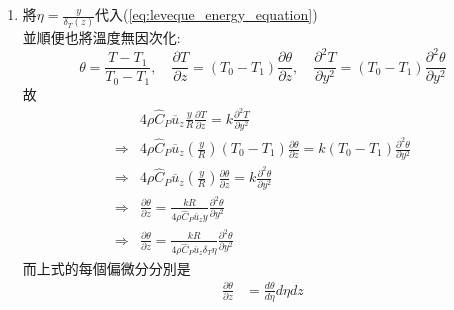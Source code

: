 \documentclass[../main.tex]{subfiles}
\begin{document}
\begin{itemize}
\begin{enumerate}
    \begin{align}
      4\rho \hat  C_P \overline u_z\frac{\delta_T}{R}\frac{T}{z} = k\frac{T}{\delta_T^2}
    \end{align}
    而兩邊因次要相等，因此:
    \begin{align}
      &\frac{4\rho \hat C_P \overline u_z T}{R z k} = \frac{1}{\delta_T^3} \nonumber\\
      \Rightarrow &\delta_T = \left(
        \frac{k R z}{4\rho \hat C_P \overline u_z}
      \right)^{1/3}
    \end{align} 
    而為了方便計算，定義特徵長度$\delta_T(z)$為:
    \begin{equation}
      \boxed{\delta_T(z) = \left(\frac{9 kRz}{4 \rho \hat C_P \overline u_z}\right)^{1/3}}
    \end{equation}
    \item 將$\eta=\frac{y}{\delta_T(z)}$代入(\ref{eq:leveque_energy_equation})\\
    並順便也將溫度無因次化:
    \begin{equation}
      \theta = \frac{T - T_1}{T_0 - T_1},\quad \frac{\partial T}{\partial z} = (T_0 - T_1) \frac{\partial\theta}{\partial z}
      ,\quad \frac{\partial^2 T}{\partial y^2} = (T_0 - T_1) \frac{\partial^2 \theta}{\partial y^2}
    \end{equation}
    故
    \begin{align}
     & 4\rho \hat  C_P \overline u_z \frac{y}{R}\frac{\partial T}{\partial z} = k \frac{\partial^2 T}{\partial y^2} \nonumber\\
    \Rightarrow& 4\rho \hat  C_P \overline u_z \left(\frac{y}{R}\right)(T_0 - T_1) \frac{\partial \theta}{\partial z} 
      = k (T_0 - T_1) \frac{\partial^2 \theta}{\partial y^2} \nonumber\\
      \Rightarrow& 4\rho \hat  C_P \overline u_z \left(\frac{y}{R}\right) \frac{\partial \theta}{\partial z} 
      = k \frac{\partial^2 \theta}{\partial y^2} \nonumber\\
      \Rightarrow& \frac{\partial \theta}{\partial z} = \frac{k R}{4\rho \hat C_P \overline u_z y} \frac{\partial^2 \theta}{\partial y^2} \nonumber\\
      \Rightarrow& \frac{\partial \theta}{\partial z} = \frac{k R}{4\rho \hat C_P \overline u_z \delta_T \eta} \frac{\partial^2 \theta}{\partial y^2} 
    \end{align}
    而上式的每個偏微分分別是
    \begin{align}
      \frac{\partial \theta}{\partial z} &= \frac{d\theta}{d\eta}{d\eta}{dz} \nonumber\\

\end{align}
\end{enumerate}
\end{itemize}
\end{document}
